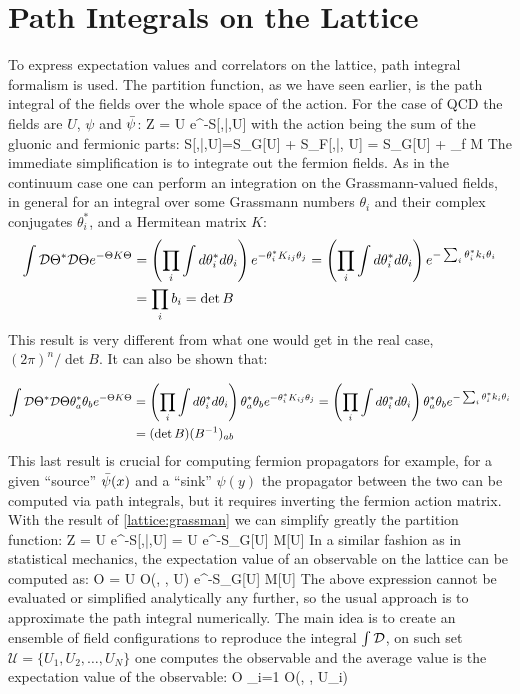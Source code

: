 \section{Path Integrals on the Lattice}
To express expectation values and correlators on the lattice, path integral formalism is used. The partition function, as we have seen earlier, is the path integral of the fields over the whole space of the action. For the case of QCD the fields are $U$, $\psi$ and $\bar{\psi}$:
\beq
	Z = \int \D\psi\D\bpsi\D U e^{-S[\psi,\bar{\psi},U] }  
\eeq
with the action being the sum of the gluonic and fermionic parts:
\beq
S[\psi,\bar{\psi},U]=S_G[U] + S_F[\psi,\bar{\psi}, U] = S_G[U] + \sum_f \bpsi M \psi
\eeq
The immediate simplification is to integrate out the fermion fields. As in the continuum case one can perform an integration on the Grassmann-valued fields, in general for an integral over some Grassmann numbers $\theta_i$ and their complex conjugates $\theta_i^*$, and a Hermitean matrix $K$:
\begin{align}
    \label{lattice:grassman}
    \int \mathcal{D}\Theta^*\mathcal{D}\Theta e^{-\Theta K \Theta } &= \left( \prod_i\int d\theta_i^*d\theta_i \right)  e^{-\theta_i^* K_{ij} \theta_j } =  \left( \prod_i\int d\theta_i^*d\theta_i \right)  e^{-\sum_i\theta_i^* k_i \theta_i } \\\nonumber
    &= \prod_i b_i = \det B
\end{align} 
This result is very different from what one would get in the real case, $(2\pi)^n/\det B$. It can also be shown that:

\begin{align}
    \int \mathcal{D}\Theta^*\mathcal{D}\Theta \theta_a^*\theta_b e^{-\Theta K \Theta } &= \left( \prod_i\int d\theta_i^*d\theta_i \right) \theta_a^*\theta_b e^{-\theta_i^* K_{ij} \theta_j } =  \left( \prod_i\int d\theta_i^*d\theta_i \right) \theta_a^*\theta_b e^{-\sum_i\theta_i^* k_i \theta_i } \\\nonumber
    &=  (\det B ) (B^{-1})_{ab}
\end{align}
This last result is crucial for computing fermion propagators for example, for a given ``source'' $\bar{\psi}(x)$ and a ``sink'' $\psi(y)$ the propagator between the two can be computed via path integrals, but it requires inverting the fermion action matrix. \\
With the result of \ref{lattice:grassman} we can simplify greatly the partition function:
\beq
	Z = \int \D\psi\D\bpsi\D U e^{-S[\psi,\bar{\psi},U] }  = \int \D U e^{-S_G[U] } \det M[U] 
\eeq
In a similar fashion as in statistical mechanics, the expectation value of an observable on the lattice can be computed as:
\beq
    \langle O \rangle =   \int \D U O(\psi, \bpsi, U) e^{-S_G[U] } \det M[U] 
    \label{lattice:expectation}
\eeq
The above expression cannot be evaluated or simplified analytically any further, so the usual approach is to approximate the path integral numerically. The main idea is to create an ensemble of field configurations to reproduce the integral $\int\mathcal{D}$, on such set $\mathcal{U} = \{ U_1, U_2, \dots,U_N \}$ one computes the observable and the average value is the expectation value of the observable:
\beq
\langle O \rangle \approx  {} \sum_{i=1} O(\psi, \bpsi, U_i) 
\eeq

